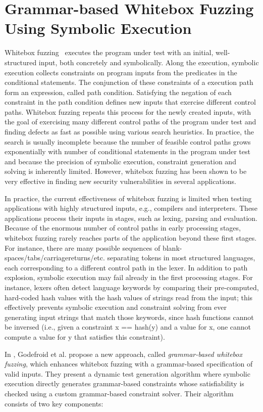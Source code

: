 \section{Grammar-based Whitebox Fuzzing Using Symbolic Execution}
Whitebox fuzzing~\cite{fuzzing} executes the program under test with an initial, well-structured input, both concretely and symbolically. Along the execution, symbolic execution collects constraints on program inputs from the predicates in the conditional statements. The conjunction of these constraints of a execution path form an expression, called path condition. Satisfying the negation of each constraint in the path condition defines new inputs that exercise different control paths. Whitebox fuzzing repeats this process for the newly created inputs, with the goal of exercising many different control paths of the program under test and finding defects as fast as possible using various search heuristics. In practice, the search is usually incomplete because the number of feasible control paths grows exponentially with number of conditional statements in the program under test and because the precision of symbolic execution, constraint generation and solving is inherently limited. However, whitebox fuzzing has been shown to be very effective in finding new security vulnerabilities in several applications.

In practice, the current effectiveness of whitebox fuzzing is limited when testing applications with highly structured
inputs, e.g., compilers and interpreters. These applications process their inputs in stages, such as lexing, parsing and evaluation. Because of the enormous number of control paths in early processing stages, whitebox fuzzing rarely reaches parts of the application beyond these first stages. For instance, there are many possible sequences of blank-spaces/tabs/carriagereturns/etc. separating tokens in most structured languages, each corresponding to a different control path in the lexer. In addition to path explosion, symbolic execution may fail already in the first processing stages. For instance, lexers often detect language keywords by comparing their pre-computed, hard-coded hash values with the hash values of strings read from the input; this effectively prevents symbolic execution and constraint solving from ever generating input strings that match those keywords, since hash functions cannot be inversed (i.e., given a constraint x == hash(y) and a value for x, one cannot compute a value for y that satisfies this constraint).

In \cite{grammar}, Godefroid et al. propose a new approach, called \textit{grammar-based whitebox fuzzing}, which enhances whitebox fuzzing with a grammar-based specification of valid inputs. They present a dynamic test generation algorithm where symbolic execution directly generates grammar-based constraints whose satisfiability is checked using a custom grammar-based constraint solver. Their algorithm consists of two key components:

